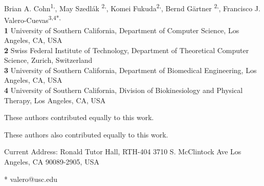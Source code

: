 \documentclass[10pt,letterpaper]{article}
\date{}
\begin{document}
\vspace*{0.2in}

\begin{flushleft}
{\Large

\textbf{}
}



Brian A. Cohn\textsuperscript{1,\Yinyang},
May Szedl\'{a}k \textsuperscript{2,\Yinyang},
Komei Fukuda\textsuperscript{2,\ddag},
Bernd G{\"a}rtner \textsuperscript{2,\ddag},
Francisco J. Valero-Cuevas\textsuperscript{3,4*,\ddag}
\\
\bigskip
\textbf{1} University of Southern California, Department of Computer Science, Los Angeles, CA, USA
\\
\textbf{2} Swiss Federal Institute of Technology, Department of Theoretical Computer Science, Zurich, Switzerland 
\\
\textbf{3} University of Southern California, Department of Biomedical Engineering, Los Angeles, CA, USA
\\
\textbf{4} University of Southern California, Division of Biokinesiology and Physical Therapy, Los Angeles, CA, USA
\\
\bigskip

%
\Yinyang These authors contributed equally to this work.

\ddag These authors also contributed equally to this work.

\textcurrency Current Address: Ronald Tutor Hall, RTH-404 
3710 S. McClintock Ave 
Los Angeles, CA 90089-2905, USA  %

* valero@usc.edu

\end{flushleft}
\end{document}
